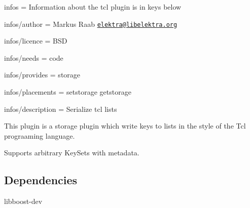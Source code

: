 
\begin{DoxyItemize}
\item infos = Information about the tcl plugin is in keys below
\item infos/author = Markus Raab \href{mailto:elektra@libelektra.org}{\tt elektra@libelektra.\+org}
\item infos/licence = B\+S\+D
\item infos/needs = code
\item infos/provides = storage
\item infos/placements = setstorage getstorage
\item infos/description = Serialize tcl lists
\end{DoxyItemize}

This plugin is a storage plugin which write keys to lists in the style of the Tcl prograaming language.

Supports arbitrary Key\+Sets with metadata.

\subsection*{Dependencies}


\begin{DoxyItemize}
\item {\ttfamily libboost-\/dev} 
\end{DoxyItemize}
